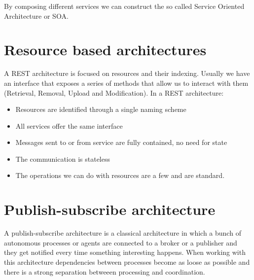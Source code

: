 By composing different services we can construct the so called Service Oriented Architecture or SOA.

\section{Resource based architectures}
A REST architecture is focused on resources and their indexing. Usually we have an interface that exposes a series of methods that allow us to interact with them (Retrieval, Removal, Upload and Modification). In a REST architecture:
\begin{itemize}
    \item Resources are identified through a single naming scheme
    \item All services offer the same interface
    \item Messages sent to or from service are fully contained, no need for state
    \item The communication is stateless
    \item The operations we can do with resources are a few and are standard.
\end{itemize}

\section{Publish-subscribe architecture}
A publish-subscribe architecture is a classical architecture in which a bunch of autonomous processes or agents are connected to a broker or a publisher and they get notified every time something interesting happens. When working with this architecture dependencies between processes become as loose as possible and there is a strong separation betweeen processing and coordination.

